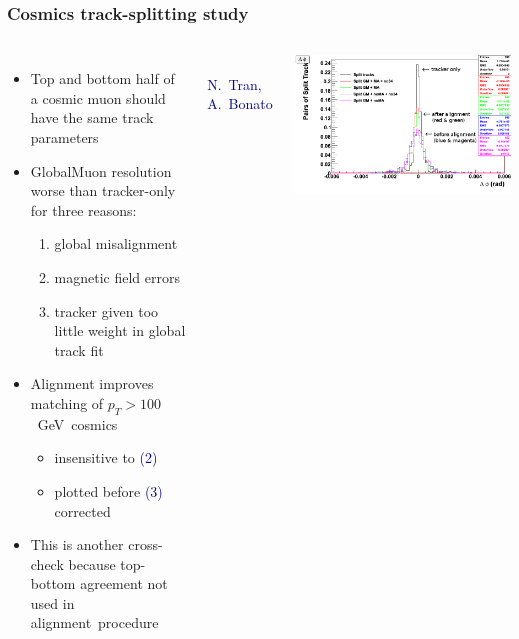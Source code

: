 \documentclass[compress]{beamer}
\begin{document}
\begin{frame}
\frametitle{Cosmics track-splitting study}

\vspace{-0.05 cm}
\begin{columns}
\begin{itemize}
\item Top and bottom half of a cosmic muon should have the same track parameters
\item GlobalMuon resolution worse than tracker-only for three reasons:
\begin{enumerate}
\item global misalignment
\item magnetic field errors
\item tracker given too little weight in global track fit
\end{enumerate}
\item Alignment improves matching of \mbox{$p_T > 100$~GeV cosmics\hspace{-1 cm}}
\begin{itemize}
\item insensitive to \textcolor{darkblue}{(2)}
\item plotted before \textcolor{darkblue}{(3)} \mbox{corrected\hspace{-1 cm}}
\end{itemize}
\item This is another cross-check because top-bottom agreement not used in \mbox{alignment procedure\hspace{-1 cm}}
\end{itemize}
\vspace{0.5 cm}

\mbox{ } \hfill \textcolor{darkblue}{\scriptsize N.~Tran, A.~Bonato} \hfill \hfill \mbox{ }

\includegraphics[width=\linewidth]{plots_dphi.png}


\end{columns}
\end{frame}
\end{document}
